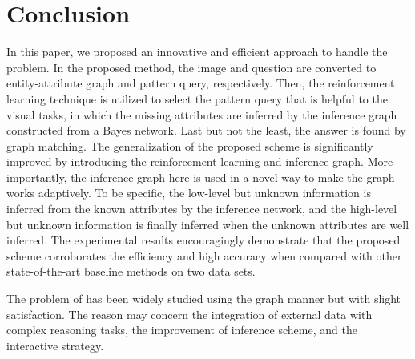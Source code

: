\section{Conclusion}
\label{sec-conclusion}
%


In this paper, we proposed an innovative and efficient approach to handle the \vqa problem. In the proposed method, the image and question are converted to entity-attribute graph and pattern query, respectively. Then, the reinforcement learning technique is utilized to select the pattern query that is helpful to the visual tasks, in which the missing attributes are inferred by the inference graph constructed from a Bayes network. Last but not the least, the answer is found by graph matching.
The generalization of the proposed scheme is significantly improved by introducing the reinforcement learning and inference graph. 
More importantly, the inference graph here is used in a novel way to make the graph works adaptively. 
To be specific, the low-level but unknown information is inferred from the known attributes by the inference network, and the high-level but unknown information is finally inferred when the unknown attributes are well inferred.
The experimental results encouragingly demonstrate that the proposed scheme corroborates the efficiency and high accuracy when compared with other state-of-the-art baseline methods on two data sets.

The problem of \vqa has been widely studied using the graph manner but with slight satisfaction. 
The reason may concern the integration of external data with complex reasoning tasks, the improvement of inference scheme, and the interactive strategy.